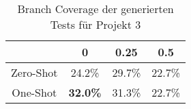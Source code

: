 \bgroup
\def\arraystretch{2}
\begin{table}[H]
	\vspace{.5cm}
	\centering		
	\begin{center}
		\begin{tabular}{|c||c|c|c|}
			\hline 
			& 0 & 0.25 & 0.5 \\
			\hline 
			\hline
			Zero-Shot & 24.2\% & 29.7\% & 22.7\% \\
			\hline
			One-Shot & \textbf{32.0\%} & 31.3\% & 22.7\% \\
			\hline
		\end{tabular} 
	\end{center}
	\caption{Branch Coverage der generierten Tests für Projekt 3}
	\label{fig:branch-3}
	\vspace{-.8cm}
\end{table}
\egroup